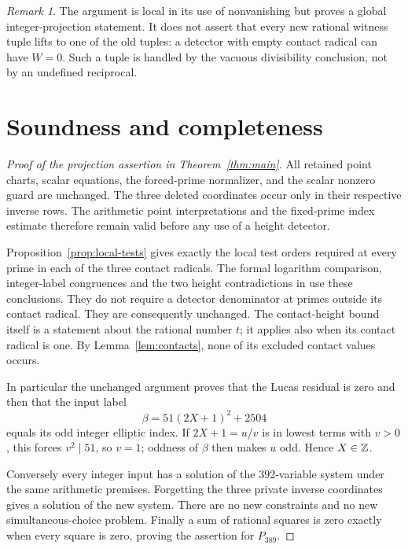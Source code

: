 \documentclass[11pt,a4paper]{article}
\theoremstyle{remark}\newtheorem{remark}[theorem]{Remark}
\begin{document}
\begin{remark}
The argument is local in its use of nonvanishing but proves a global
integer-projection statement. It does not assert that every new rational
witness tuple lifts to one of the old tuples: a detector with empty
contact radical can have $W=0$. Such a tuple is handled by the vacuous
divisibility conclusion, not by an undefined reciprocal.
\end{remark}

\section{Soundness and completeness}

\begin{proof}[Proof of the projection assertion in Theorem~\ref{thm:main}]
All retained point charts, scalar equations, the forced-prime
normalizer, and the scalar nonzero guard are unchanged. The three
deleted coordinates occur only in their respective inverse rows.
The arithmetic point interpretations and the fixed-prime index estimate
therefore remain valid before any use of a height detector.

Proposition~\ref{prop:local-tests} gives exactly the local test orders
required at every prime in each of the three contact radicals. The
formal logarithm comparison, integer-label congruences and the two
height contradictions in \cite[Sections~2 and~5]{Construction392}
use these conclusions. They do not require a detector denominator at
primes outside its contact radical. They are consequently unchanged.
The contact-height bound itself is a statement about the rational
number $t$; it applies also when its contact radical is one. By
Lemma~\ref{lem:contacts}, none of its excluded contact values occurs.

In particular the unchanged argument proves that the Lucas residual
is zero and then that the input label
\[
                         \beta=51(2X+1)^2+2504
\]
equals its odd integer elliptic index. If $2X+1=u/v$ is in lowest
terms with $v>0$, this forces $v^2\mid51$, so $v=1$; oddness of
$\beta$ then makes $u$ odd. Hence $X\in\mathbb Z$.

Conversely every integer input has a solution of the 392-variable
system under the same arithmetic premises. Forgetting the three
private inverse coordinates gives a solution of the new system.
There are no new constraints and no new simultaneous-choice problem.
Finally a sum of rational squares is zero exactly when every square
is zero, proving the assertion for $P_{389}$.
\end{proof}
\end{document}
